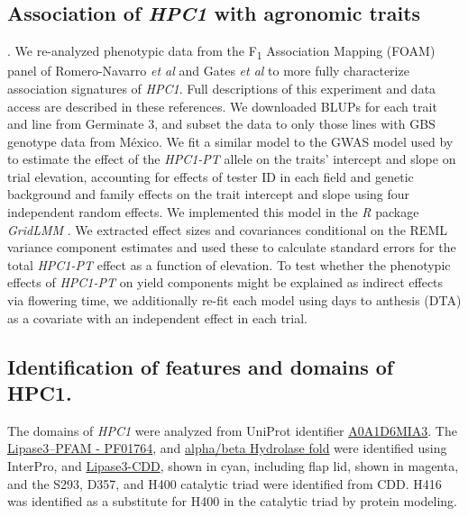 \documentclass[9pt,twocolumn,twoside,lineno]{biorxiv}
\newcommand{\hpc}{\textit{HPC1}\xspace}
\begin{document}
\subsection{Association of \hpc with agronomic traits}.
We re-analyzed phenotypic data from the F\textsubscript{1} Association Mapping (FOAM) panel of Romero-Navarro \textit{et al} \cite{Romero_Navarro2017-cn} and Gates \textit{et al} \cite{Gates2019-xu} to more fully characterize association signatures of \hpc. 
Full descriptions of this experiment and data access are described in these references. 
We downloaded BLUPs for each trait and line from Germinate 3, and subset the data to only those lines with GBS genotype data from M\'exico. 
We fit a similar model to the GWAS model used by \cite{Gates2019-xu} to estimate the effect of the \textit{HPC1-PT} allele on the traits' intercept and slope on trial elevation, accounting for effects of tester ID in each field and genetic background and family effects on the trait intercept and slope using four independent random effects. 
We implemented this model in the \textit{R} package \textit{GridLMM} \cite{Runcie2019-Gr}. 
We extracted effect sizes and covariances conditional on the REML variance component estimates and used these to calculate standard errors for the total \textit{HPC1-PT} effect as a function of elevation. 
To test whether the phenotypic effects of \textit{HPC1-PT} on yield components might be explained as indirect effects via flowering time, we additionally re-fit each model using days to anthesis (DTA) as a covariate with an independent effect in each trial.
\subsection{Identification of features and domains of HPC1.}
The domains of \hpc were analyzed from UniProt identifier \hyperlink{https://www.uniprot.org/uniprot/A0A1D6MIA3}{A0A1D6MIA3}. 
The \hyperlink{https://www.ebi.ac.uk/interpro/entry/pfam/PF01764/}{Lipase3--PFAM - PF01764}, and \hyperlink{https://www.ebi.ac.uk/interpro/entry/InterPro/IPR029058/}{alpha/beta Hydrolase fold} were identified using InterPro, and \hyperlink{https://www.ncbi.nlm.nih.gov/Structure/cdd/cddsrv.cgi?uid=cd00519}{Lipase3-CDD}, shown in cyan, including flap lid, shown in magenta, and the S293, D357, and H400 catalytic triad were identified from CDD. 
H416 was identified as a substitute for H400 in the catalytic triad by protein modeling.
\end{document}

